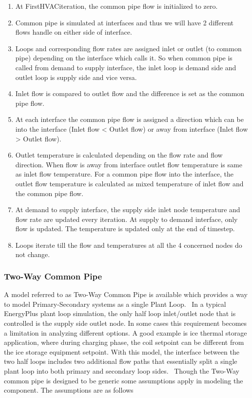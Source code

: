 \begin{enumerate}
\def\labelenumi{\arabic{enumi}.}
\item
  At FirstHVACiteration, the common pipe flow is initialized to zero.
\item
  Common pipe is simulated at interfaces and thus we will have 2 different flows handle on either side of interface.
\item
  Loops and corresponding flow rates are assigned inlet or outlet (to common pipe) depending on the interface which calls it. So when common pipe is called from demand to supply interface, the inlet loop is demand side and outlet loop is supply side and vice versa.
\item
  Inlet flow is compared to outlet flow and the difference is set as the common pipe flow.
\item
  At each interface the common pipe flow is assigned a direction which can be into the interface (Inlet flow \textless{} Outlet flow) or away from interface (Inlet flow \textgreater{} Outlet flow).
\item
  Outlet temperature is calculated depending on the flow rate and flow direction. When flow is away from interface outlet flow temperature is same as inlet flow temperature. For a common pipe flow into the interface, the outlet flow temperature is calculated as mixed temperature of inlet flow and the common pipe flow.
\item
  At demand to supply interface, the supply side inlet node temperature and flow rate are updated every iteration. At supply to demand interface, only flow is updated. The temperature is updated only at the end of timestep.
\item
  Loops iterate till the flow and temperatures at all the 4 concerned nodes do not change.
\end{enumerate}

\subsubsection{Two-Way Common Pipe}\label{two-way-common-pipe}

A model referred to as Two-Way Common Pipe is available which provides a way to model Primary-Secondary systems as a single Plant Loop.~ In a typical EnergyPlus plant loop simulation, the only half loop inlet/outlet node that is controlled is the supply side outlet node. In some cases this requirement becomes a limitation in analyzing different options. A good example is ice thermal storage application, where during charging phase, the coil setpoint can be different from the ice storage equipment setpoint. With this model, the interface between the two half loops includes two additional flow paths that essentially split a single plant loop into both primary and secondary loop sides.~ Though the Two-Way common pipe is designed to be generic some assumptions apply in modeling the component. The assumptions are as follows

